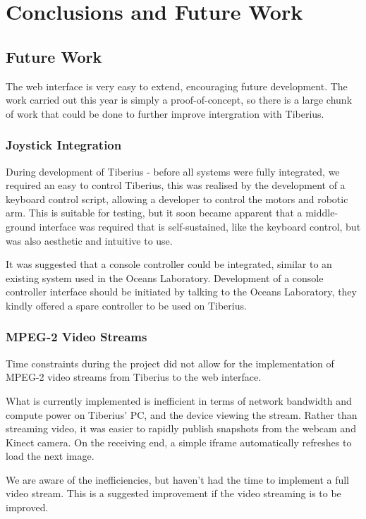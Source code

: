 \section{Conclusions and Future Work}

\subsection{Future Work}
The web interface is very easy to extend, encouraging future development.
The work carried out this year is simply a proof-of-concept, so there is a large
chunk of work that could be done to further improve intergration with Tiberius.

\subsubsection{Joystick Integration}
During development of Tiberius - before all systems were fully integrated, we required an easy
to control Tiberius, this was realised by the development of a keyboard control script, allowing a developer to control the motors and robotic arm. This is suitable for testing, but it soon became apparent that a middle-ground interface was required that is self-sustained, like the keyboard control, but was also aesthetic and intuitive to use.

It was suggested that a console controller could be integrated, similar to an existing system used in the Oceans Laboratory. Development of a console controller interface should be initiated by talking to the Oceans Laboratory, they kindly offered a spare controller to be used on Tiberius.


\subsubsection{MPEG-2 Video Streams}
Time constraints during the project did not allow for the implementation of
\gls{MPEG-2} video streams from Tiberius to the web interface.

What is currently implemented is inefficient in terms of network bandwidth and
compute power on Tiberius' PC, and the device viewing the stream. Rather than streaming video, it was easier to rapidly publish snapshots from the webcam and Kinect camera. On the receiving end, a simple iframe automatically refreshes to load the next image.

We are aware of the inefficiencies, but haven't had the time to implement a full video stream. This is a suggested improvement if the video streaming is to be improved.

